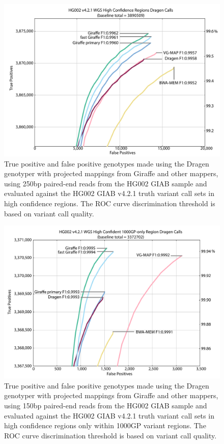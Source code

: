 \documentclass[11pt]{ucscthesis}
\begin{document}
\begin{figure}[p]
    \centering
    \includegraphics[width=\linewidth]{HG002_v4.2.1_high_conf.35x_250bp.wgs.vcfevalroc.pdf}
    \caption[Genotyping evaluation for the Dragen genotyper with projected mappings from Giraffe and other mappers]{True positive and false positive genotypes made using the Dragen genotyper with projected mappings from Giraffe and other mappers, using 250bp paired-end reads from the HG002 GIAB sample and evaluated against the HG002 GIAB v4.2.1 truth variant call sets in high confidence regions. The ROC curve discrimination threshold is based on variant call quality.}
    \label{fig:250bp_genotyping}
\end{figure}
\begin{figure}[p]
    \centering
    \includegraphics[width=\linewidth]{HG002_v4.2.1_high_conf.35x_150bp.wgs.vcfevalroc.1000GP_only.pdf}
    \caption[Genotyping evaluation for the Dragen genotyper with projected mappings from Giraffe and other mappers in 1000GP regions only]{True positive and false positive genotypes made using the Dragen genotyper with projected mappings from Giraffe and other mappers, using 150bp paired-end reads from the HG002 GIAB sample and evaluated against the HG002 GIAB v4.2.1 truth variant call sets in high confidence regions only within 1000GP variant regions. The ROC curve discrimination threshold is based on variant call quality.}
    \label{fig:150bp_genotyping_1000GP_only}
\end{figure}
\end{document}
